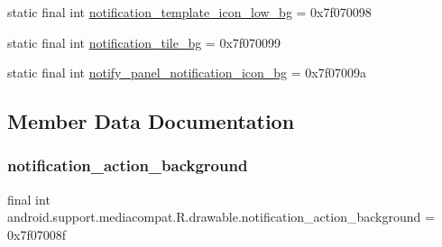 \begin{DoxyCompactItemize}
\item 
static final int \mbox{\hyperlink{classandroid_1_1support_1_1mediacompat_1_1R_1_1drawable_aa387aaa3835959e25ba0b23273f5cdde}{notification\+\_\+template\+\_\+icon\+\_\+low\+\_\+bg}} = 0x7f070098
\item 
static final int \mbox{\hyperlink{classandroid_1_1support_1_1mediacompat_1_1R_1_1drawable_a3e361078e38f4d19d7c16e43feafd1e2}{notification\+\_\+tile\+\_\+bg}} = 0x7f070099
\item 
static final int \mbox{\hyperlink{classandroid_1_1support_1_1mediacompat_1_1R_1_1drawable_a1111dc9feb55483a5e44a84481588b18}{notify\+\_\+panel\+\_\+notification\+\_\+icon\+\_\+bg}} = 0x7f07009a
\end{DoxyCompactItemize}


\subsection{Member Data Documentation}
\mbox{\label{classandroid_1_1support_1_1mediacompat_1_1R_1_1drawable_a0b69d61f065c3d3b73b5eca274c167f9}} 
\subsubsection{\texorpdfstring{notification\+\_\+action\+\_\+background}{notification\_action\_background}}
{\footnotesize\ttfamily final int android.\+support.\+mediacompat.\+R.\+drawable.\+notification\+\_\+action\+\_\+background = 0x7f07008f\hspace{0.3cm}{\ttfamily [static]}}

\mbox{\label{classandroid_1_1support_1_1mediacompat_1_1R_1_1drawable_a5fb8e7e3a4bf4505e571d6104e0e1461}} 
